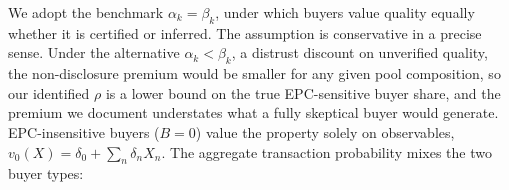 We adopt the benchmark $\alpha_k=\beta_k$, under which buyers value quality equally whether it is certified or inferred. The assumption is conservative in a precise sense. Under the alternative $\alpha_k<\beta_k$, a distrust discount on unverified quality, the non-disclosure premium would be smaller for any given pool composition, so our identified $\rho$ is a lower bound on the true EPC-sensitive buyer share, and the premium we document understates what a fully skeptical buyer would generate. EPC-insensitive buyers ($B=0$) value the property solely on observables, $v_0(X)=\delta_0+\sum_n\delta_n X_n$. The aggregate transaction probability mixes the two buyer types:
